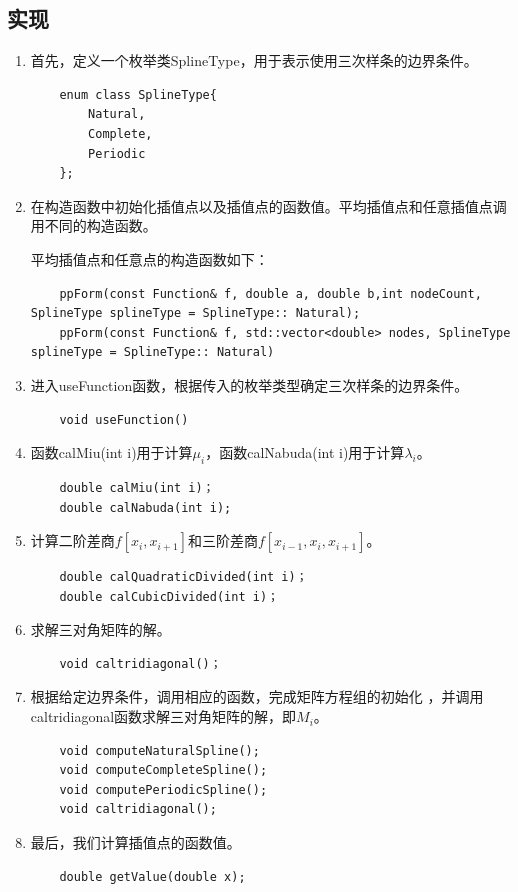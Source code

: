 \documentclass[UTF8]{ctexart}
\begin{document}
\subsection*{实现}
\begin{enumerate}
    \item 首先，定义一个枚举类SplineType，用于表示使用三次样条的边界条件。
    \begin{lstlisting}
    enum class SplineType{
        Natural,
        Complete,
        Periodic
    };
    \end{lstlisting}

    \item 在构造函数中初始化插值点以及插值点的函数值。平均插值点和任意插值点调用不同的构造函数。
    \par 平均插值点和任意点的构造函数如下：
    \begin{lstlisting}
    ppForm(const Function& f, double a, double b,int nodeCount, SplineType splineType = SplineType:: Natural);
    ppForm(const Function& f, std::vector<double> nodes, SplineType splineType = SplineType:: Natural)
    \end{lstlisting}

    \item 进入useFunction函数，根据传入的枚举类型确定三次样条的边界条件。
    \begin{lstlisting}
    void useFunction()
    \end{lstlisting}

    \item 函数calMiu(int i)用于计算$\mu_{i}$，函数calNabuda(int i)用于计算$\lambda_{i}$。
    \begin{lstlisting}
    double calMiu(int i)；
    double calNabuda(int i);
    \end{lstlisting}

    \item 计算二阶差商$f[x_{i}, x_{i+1}]$和三阶差商$f[x_{i-1}, x_{i}, x_{i+1}]$。
    \begin{lstlisting}
    double calQuadraticDivided(int i)；
    double calCubicDivided(int i)；
    \end{lstlisting}

    \item 求解三对角矩阵的解。
    \begin{lstlisting}
    void caltridiagonal()；
    \end{lstlisting}

    \item 根据给定边界条件，调用相应的函数，完成矩阵方程组的初始化
    ，并调用caltridiagonal函数求解三对角矩阵的解，即$M_{i}$。
    \begin{lstlisting}
    void computeNaturalSpline();
    void computeCompleteSpline();
    void computePeriodicSpline();
    void caltridiagonal();
    \end{lstlisting}
    

    \item 最后，我们计算插值点的函数值。
    \begin{lstlisting}
    double getValue(double x);
    \end{lstlisting}
\end{enumerate}
\end{document}
